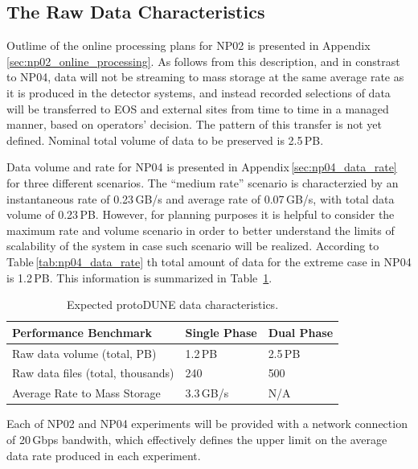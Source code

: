 \documentclass[pdftex,12pt,letter]{article}
\begin{document}
\subsection{ The Raw Data Characteristics}
Outlime of the online processing plans for NP02 is presented in Appendix\,\ref{sec:np02_online_processing}.
As follows from this description, and in constrast to NP04, data will not be streaming to mass storage at
the same average rate as it is produced in the detector systems, and instead recorded selections of data
will be transferred to EOS and external sites from time to time in a managed manner, based on operators' decision.
The pattern of this transfer is not yet defined. Nominal total volume of data to be preserved is 2.5\,PB.

Data volume and rate for NP04 is presented in Appendix\,\ref{sec:np04_data_rate} for three
different scenarios.
The ``medium rate'' scenario is characterzied by an instantaneous rate of 0.23\,GB/s and
average rate of 0.07\,GB/s, with total data volume of 0.23\,PB. However, for planning
purposes it is helpful to consider the maximum rate and volume scenario in order to better
understand the limits of  scalability of
the system in case such scenario will be realized. According to Table\,\ref{tab:np04_data_rate}
th total amount of data for the extreme case in NP04 is 1.2\,PB. This information
is summarized in Table~\ref{fig:det_perf}.
\begin{table}[tbh]
\centering
\begin{tabular}{l l l}
\hline
\textbf{Performance Benchmark} & \textbf{Single Phase} & \textbf{Dual Phase}\\
\hline
\hline
Raw data volume (total, PB)                    & 1.2\,PB & 2.5\,PB \\
Raw data files (total, thousands)            & 240  & 500\\
Average Rate to Mass Storage & 3.3\,GB/s & N/A \\
\hline
\end{tabular}
\caption{\label{fig:det_perf}Expected protoDUNE data characteristics.}
\end{table}

\noindent Each of NP02 and NP04 experiments will be provided with a network connection of 20\,Gbps
bandwith, which effectively defines the upper limit on the average data rate
produced in each experiment.
\end{document}
